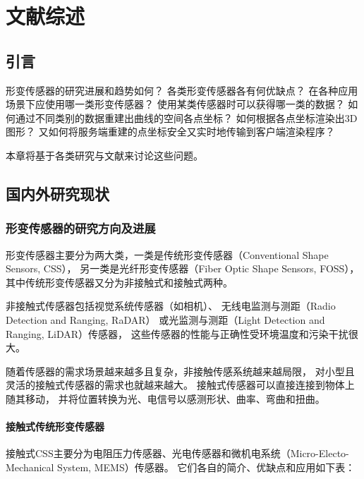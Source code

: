 \cleardoublepage
\chapter{文献综述}
\section{引言} 
形变传感器的研究进展和趋势如何？
各类形变传感器各有何优缺点？
在各种应用场景下应使用哪一类形变传感器？
使用某类传感器时可以获得哪一类的数据？
如何通过不同类别的数据重建出曲线的空间各点坐标？
如何根据各点坐标渲染出3D图形？
又如何将服务端重建的点坐标安全又实时地传输到客户端渲染程序？

本章将基于各类研究与文献来讨论这些问题。

\section{国内外研究现状}
\subsection{形变传感器的研究方向及进展}

形变传感器主要分为两大类，一类是传统形变传感器（Conventional Shape Sensors, CSS），
另一类是光纤形变传感器（Fiber Optic Shape Sensors, FOSS）， 
其中传统形变传感器又分为非接触式和接触式两种。

非接触式传感器包括视觉系统传感器（如相机）、
无线电监测与测距（Radio Detection and Ranging, RaDAR）
或光监测与测距（Light Detection and Ranging, LiDAR）传感器，
这些传感器的性能与正确性受环境温度和污染干扰很大。

随着传感器的需求场景越来越多且复杂，非接触传感系统越来越局限，
对小型且灵活的接触式传感器的需求也就越来越大。
接触式传感器可以直接连接到物体上随其移动，
并将位置转换为光、电信号以感测形状、曲率、弯曲和扭曲。

\subsubsection{接触式传统形变传感器}

接触式CSS主要分为电阻压力传感器、光电传感器和微机电系统（Micro-Electo-Mechanical System, MEMS）传感器。
它们各自的简介、优缺点和应用如下表\cite{recent-dev-in-foss}：

